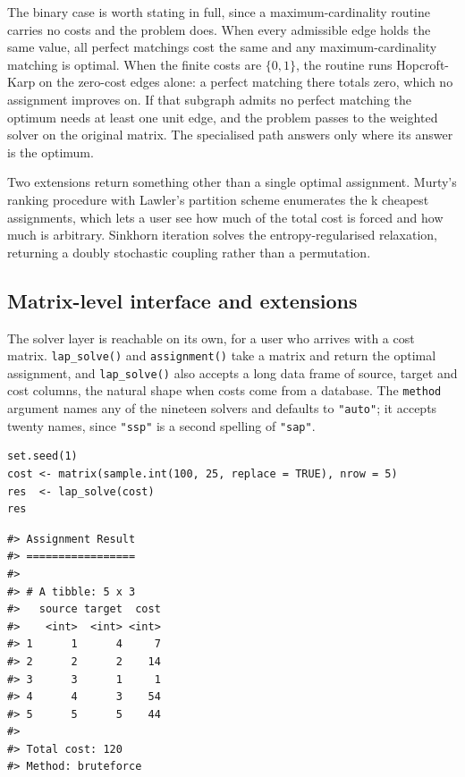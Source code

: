 The binary case is worth stating in full, since a maximum-cardinality routine
carries no costs and the problem does. When every admissible edge holds the
same value, all perfect matchings cost the same and any maximum-cardinality
matching is optimal. When the finite costs are \(\{0, 1\}\), the routine runs
Hopcroft-Karp on the zero-cost edges alone: a perfect matching there totals
zero, which no assignment improves on. If that subgraph admits no perfect
matching the optimum needs at least one unit edge, and the problem passes to
the weighted solver on the original matrix. The specialised path answers only
where its answer is the optimum.

Two extensions return something other than a single optimal assignment. Murty's
ranking procedure \citep{Murty1968} with Lawler's partition scheme \citep{Lawler1972}
enumerates the k cheapest assignments, which lets a user see how much of the
total cost is forced and how much is arbitrary. Sinkhorn iteration \citep{Cuturi2013}
solves the entropy-regularised relaxation, returning a doubly stochastic
coupling rather than a permutation.

\subsection{Matrix-level interface and extensions}\label{matrix-level-interface-and-extensions}

The solver layer is reachable on its own, for a user who arrives with a cost
matrix. \texttt{lap\_solve()} and \texttt{assignment()} take a matrix and return the optimal
assignment, and \texttt{lap\_solve()} also accepts a long data frame of source, target
and cost columns, the natural shape when costs come from a database. The
\texttt{method} argument names any of the nineteen solvers and defaults to \texttt{"auto"};
it accepts twenty names, since \texttt{"ssp"} is a second spelling of \texttt{"sap"}.

\begin{verbatim}
set.seed(1)
cost <- matrix(sample.int(100, 25, replace = TRUE), nrow = 5)
res  <- lap_solve(cost)
res
\end{verbatim}

\begin{verbatim}
#> Assignment Result
#> =================
#> 
#> # A tibble: 5 x 3
#>   source target  cost
#>    <int>  <int> <int>
#> 1      1      4     7
#> 2      2      2    14
#> 3      3      1     1
#> 4      4      3    54
#> 5      5      5    44
#> 
#> Total cost: 120 
#> Method: bruteforce
\end{verbatim}

